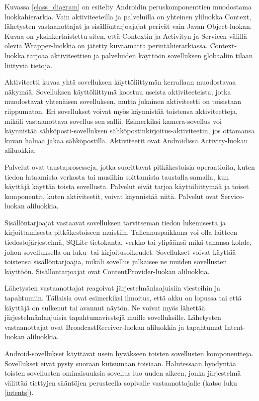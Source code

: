 Kuvassa \ref{class_diagram} on esitelty Androidin peruskomponenttien muodostama luokkahierarkia. Vain aktiviteeteilla ja palveluilla on yhteinen yliluokka Context, lähetysten vastaanottajat ja sisällöntarjoajajat perivät vain Javan Object-luokan. Kuvaa on yksinkertaistettu siten, että Contextin ja Activityn ja Servicen välillä olevia Wrapper-luokkia on jätetty kuvaamatta perintähierarkiassa. Context-luokka tarjoaa aktiviteettien ja palveluiden käyttöön sovelluksen globaaliin tilaan liittyviä tietoja.

Aktiviteetti kuvaa yhtä sovelluksen käyttöliittymän kerrallaan muodostavaa näkymää. Sovelluksen käyttöliittymä koostuu useista aktiviteeteista, jotka muodostavat yhtenäisen sovelluksen, mutta jokainen aktiviteetti on toisistaan riippumaton. Eri sovellukset voivat myös käynnistää toistensa aktiviteetteja, mikäli vastaanottava sovellus sen sallii. Esimerkiksi kamera-sovellus voi käynnistää sähköposti-sovelluksen sähköpostinkirjoitus-aktiviteetin, jos ottamansa kuvan haluaa jakaa sähköpostilla. Aktiviteetit ovat Androidissa Activity-luokan aliluokkia.

Palvelut ovat taustaprosesseja, jotka suorittavat pitkäkestoisia operaatioita, kuten tiedon lataamista verkosta tai musiikin soittamista taustalla samalla, kun käyttäjä käyttää toista sovellusta. Palvelut eivät tarjoa käyttöliittymää ja toiset komponentit, kuten aktiviteetit, voivat käynnistää niitä. Palvelut ovat Service-luokan aliluokkia.

Sisällöntarjoajat vastaavat sovelluksen tarvitseman tiedon lukemisesta ja kirjoittamisesta pitkäkestoiseen muistiin. Tallennuspaikkana voi olla laitteen tiedostojärjestelmä, SQLite-tietokanta, verkko tai ylipäänsä mikä tahansa kohde, johon sovelluksella on luku- tai kirjoitusoikeudet. Sovellukset voivat käyttää toistensa sisällöntarjoajia, mikäli sovellus julkaisee ne muiden sovellusten käyttöön. Sisällöntarjoajat ovat ContentProvider-luokan aliluokkia.

Lähetysten vastaanottajat reagoivat järjestelmänlaajuisiin viesteihin ja tapahtumiin. Tällaisia ovat esimerkiksi ilmoitus, että akku on lopussa tai että käyttäjä on sulkenut tai avannut näytön. Ne voivat myös lähettää järjestelmänlaajuisia tapahtumaviestejä muille sovelluksille. Lähetysten vastaanottajat ovat BroadcastReceiver-luokan aliluokkia ja tapahtumat Intent-luokan aliluokkia.

Android-sovellukset käyttävät usein hyväkseen toisten sovellusten komponentteja. Sovellukset eivät pysty suoraan kutsumaan toisiaan. Halutessaan hyödyntää toisten sovellusten ominaisuuksia sovellus luo uuden aikeen, jonka järjestelmä välittää tiettyjen sääntöjen perusteella sopivalle vastaanottajalle (katso luku \ref{intents}). 

